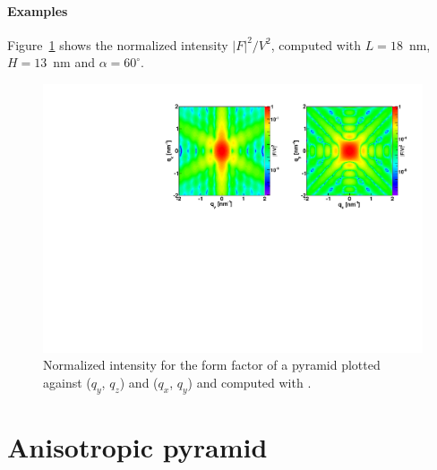 \paragraph{Examples}
Figure~\ref{fig:FFPyramidEx} shows the normalized intensity
$|F|^2/V^2$, computed with $L=18$~nm, $H=13$~nm and
$\alpha=60^{\circ}$.

\begin{figure}[h]
\begin{center}
\includegraphics[width=\textwidth]{Figures/figffpyramid}
\end{center}
\caption{Normalized intensity for the form factor of a
  pyramid plotted against ($q_y$, $q_z$) and  
  ($q_x$, $q_y$) and computed with  .}
\label{fig:FFPyramidEx}
\end{figure}

\newpage%
\section{Anisotropic pyramid}  

